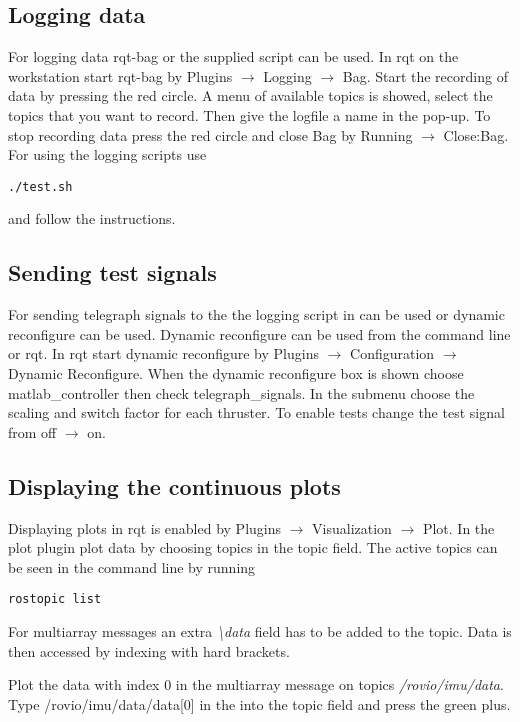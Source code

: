 \subsection{Logging data}\label{sec:logging}
For logging data rqt-bag or the supplied script can be used. In rqt on the workstation start rqt-bag by Plugins $\rightarrow$ Logging $\rightarrow$ Bag. Start the recording of data by pressing the red circle. A menu of available topics is showed, select the topics that you want to record. Then give the logfile a name in the pop-up.
To stop recording data press the red circle and close Bag by Running $\rightarrow$ Close:Bag. For using the logging scripts use 
\begin{lstlisting}
./test.sh
\end{lstlisting}
and follow the instructions.

\subsection{Sending test signals}
For sending telegraph signals to the \abbrROV the logging script in  can be used or dynamic reconfigure can be used. Dynamic reconfigure can be used from the command line or rqt. In rqt start dynamic reconfigure by Plugins $\rightarrow$ Configuration $\rightarrow$ Dynamic Reconfigure. When the dynamic reconfigure box is shown choose matlab\_controller then check telegraph\_signals. In the submenu choose the scaling and switch factor for each thruster.
To enable tests change the test signal from off $\rightarrow$ on.    

\subsection{Displaying the continuous plots}
Displaying plots in rqt is enabled by Plugins $\rightarrow$ Visualization $\rightarrow$ Plot. In the plot plugin plot data by choosing topics in the topic field. The active topics can be seen in the command line by running 
\begin{lstlisting}
rostopic list
\end{lstlisting}
For multiarray messages an extra \textit{\textbackslash data} field has to be added to the topic. Data is then accessed by indexing with hard brackets. 
\begin{example}
Plot the data with index 0 in the multiarray message on topics \textit{/rovio/imu/data}. Type /rovio/imu/data/data[0] in the into the topic field and press the green plus.  
\end{example}

